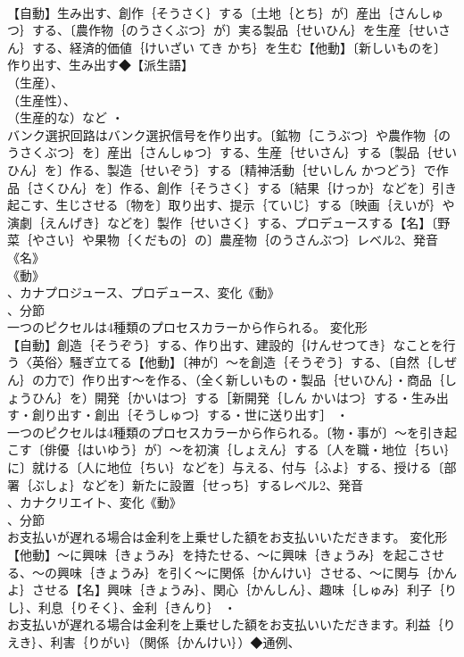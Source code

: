 \documentclass[8pt]{extreport}
\begin{document}
\begin{CJK}{UTF8}{min}
\\	【自動】生み出す、創作｛そうさく｝する〔土地｛とち｝が〕産出｛さんしゅつ｝する、〔農作物｛のうさくぶつ｝が〕実る製品｛せいひん｝を生産｛せいさん｝する、経済的価値｛けいざい てき かち｝を生む【他動】〔新しいものを〕作り出す、生み出す◆【派生語】
\\	（生産）、
\\	（生産性）、
\\	（生産的な）など ・
\\	バンク選択回路はバンク選択信号を作り出す。〔鉱物｛こうぶつ｝や農作物｛のうさくぶつ｝を〕産出｛さんしゅつ｝する、生産｛せいさん｝する〔製品｛せいひん｝を〕作る、製造｛せいぞう｝する〔精神活動｛せいしん かつどう｝で作品｛さくひん｝を〕作る、創作｛そうさく｝する〔結果｛けっか｝などを〕引き起こす、生じさせる〔物を〕取り出す、提示｛ていじ｝する〔映画｛えいが｝や演劇｛えんげき｝などを〕製作｛せいさく｝する、プロデュースする【名】〔野菜｛やさい｝や果物｛くだもの｝の〕農産物｛のうさんぶつ｝レベル2、発音《名》
\\	《動》
\\	、カナプロジュース、プロデュース、変化《動》
\\	、分節
\\	一つのピクセルは4種類のプロセスカラーから作られる。	変化形 
\\	【自動】創造｛そうぞう｝する、作り出す、建設的｛けんせつてき｝なことを行う〈英俗〉騒ぎ立てる【他動】〔神が〕～を創造｛そうぞう｝する、〔自然｛しぜん｝の力で〕作り出す～を作る、（全く新しいもの・製品｛せいひん｝・商品｛しょうひん｝を）開発｛かいはつ｝する［新開発｛しん かいはつ｝する・生み出す・創り出す・創出｛そうしゅつ｝する・世に送り出す］ ・
\\	一つのピクセルは4種類のプロセスカラーから作られる。〔物・事が〕～を引き起こす〔俳優｛はいゆう｝が〕～を初演｛しょえん｝する〔人を職・地位｛ちい｝に〕就ける〔人に地位｛ちい｝などを〕与える、付与｛ふよ｝する、授ける〔部署｛ぶしょ｝などを〕新たに設置｛せっち｝するレベル2、発音
\\	、カナクリエイト、変化《動》
\\	、分節
\\	お支払いが遅れる場合は金利を上乗せした額をお支払いいただきます。	変化形 
\\	【他動】～に興味｛きょうみ｝を持たせる、～に興味｛きょうみ｝を起こさせる、～の興味｛きょうみ｝を引く～に関係｛かんけい｝させる、～に関与｛かんよ｝させる【名】興味｛きょうみ｝、関心｛かんしん｝、趣味｛しゅみ｝利子｛りし｝、利息｛りそく｝、金利｛きんり｝ ・
\\	お支払いが遅れる場合は金利を上乗せした額をお支払いいただきます。利益｛りえき｝、利害｛りがい｝（関係｛かんけい｝）◆通例、

\end{CJK}
\end{document}
